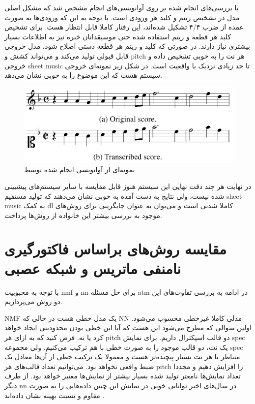 با بررسی‌های انجام شده بر روی آوانویسی‌های انجام مشخص شد که مشکل اصلی مدل در
تشخیص ریتم و کلید هر ورودی است. با توجه به این که ورودی‌ها به صورت عمده از ضرب
۴/۴ تشکیل شده‌اند، این رفتار کاملا قابل انتظار هست. برای تشخیص کلید هر قطعه و
ریتم استفاده شده حتی موسیقدانان خبره نیز به اطلاعات بسیار بیشتری نیاز دارند. در
صورتی که کلید و ریتم هر قطعه دستی اصلاح شود، مدل خروجی قابل قبولی تولید می‌کند و
می‌تواند کشش و \gls{pitch} هر نت را به خوبی تشخیص داده و خروجی \gls{sheet music}
تا حد زیادی نزدیک با واقعیت است. در شکل زیر نمونه‌ای خروجی سیستم هست که این
موضوع را به خوبی نشان می‌دهد.
\begin{figure}[ht]
    \centering
    \includegraphics[width=12cm]{./statics/roman2018end_output.png}
    \caption{نمونه‌ای از آوانویسی انجام شده توسط \cite{roman2018end}}
\end{figure}

در نهایت هر چند دقت نهایی این سیستم هنوز قابل مقایسه با سایر سیستم‌های پیشبینی
شده نیست، ولی نتایج به دست آمده به خوبی نشان می‌دهند که تولید مستقیم \gls{sheet
music} به کمک \gls{dl} کاملا شدنی است و می‌توان به عنوان جایگزینی برای روش‌های
موجود به بررسی بیشتر این خانواده از روش‌ها پرداخت.

\section{مقایسه روش‌های براساس فاکتورگیری نامنفی ماتریس و شبکه عصبی}
با توجه به محبوبیت \gls{nmf} و \gls{nn} برای حل مسئله \gls{atm} در ادامه به
بررسی تفاوت‌های این دو روش می‌پردازیم.

\gls{NMF} یک مدل خطی هست در حالی که \gls{NN} مدلی کاملا غیرخطی محسوب می‌شود.
اولین سوالی که مطرح می‌شود این هست که آیا این خطی بودن محدودیتی ایجاد خواهد کرد
یا نه. فرض کنید که به ازای هر \gls{pitch} دو قالب اسپکترال داریم. برای نمایش
\gls{spec} یک نت، دو قالب موجود را به صورت خطی با هم ترکیب می‌کنیم. ولی مجموعه
\gls{spec} متناظر با هر نت بسیار پیچیده‌تر هست و معمولا یک ترکیب خطی از آن‌ها
معادل یک ضبط واقعی نخواهد بود. می‌توانیم تعداد قالب‌های هر \gls{pitch} را افزایش
دهیم و مجددا تعداد نمایش‌ها نامعتر تولید شده بسیار بیشتر از نمایش‌ها معتبر خواهد
بود. از طرف دیگر \gls{nn} در سال‌های اخیر توانایی خوبی در نمایش این چنین
داده‌هایی را به صورت مقاوم و نسبت بهینه نشان داده‌اند \cite{goodfellow2016deep}.

